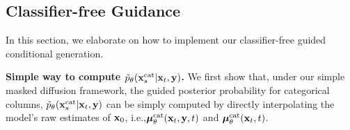 \begin{rebuttal}
\subsection{Classifier-free Guidance}
\label{appendix:cfg}
In this section, we elaborate on how to implement our classifier-free guided conditional generation.

\textbf{Simple way to compute $\tilde{p}_{\theta}({\mathbf{x}}_{s}^{{\rm cat}} | {\mathbf{x}}_t, {\mathbf{y}})$.} We first show that, under our simple masked diffusion framework, the guided posterior probability for categorical columns, $\tilde{p}_{\theta}({\mathbf{x}}_{s}^{{\rm cat}} | {\mathbf{x}}_t, {\mathbf{y}})$ can be simply computed by directly interpolating the model's raw estimates of ${\mathbf{x}}_0$, i.e.,${\bm{\mu}}_\theta^{{\rm cat}}({\mathbf{x}}_t, {\mathbf{y}}, t)$ and ${\bm{\mu}}_\theta^{{\rm cat}}({\mathbf{x}}_t, t)$.


\end{rebuttal}
